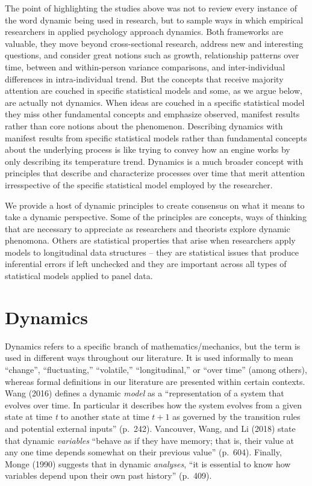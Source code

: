 \documentclass[english,,man]{apa6}
\begin{document}
The point of highlighting the studies above was not to review every instance of the word dynamic being used in research, but to sample ways in which empirical researchers in applied psychology approach dynamics. Both frameworks are valuable, they move beyond cross-sectional research, address new and interesting questions, and consider great notions such as growth, relationship patterns over time, between and within-person variance comparisons, and inter-individual differences in intra-individual trend. But the concepts that receive majority attention are couched in specific statistical models and some, as we argue below, are actually not dynamics. When ideas are couched in a specific statistical model they miss other fundamental concepts and emphasize observed, manifest results rather than core notions about the phenomenon. Describing dynamics with manifest results from specific statistical models rather than fundamental concepts about the underlying process is like trying to convey how an engine works by only describing its temperature trend. Dynamics is a much broader concept with principles that describe and characterize processes over time that merit attention irresspective of the specific statistical model employed by the researcher.

We provide a host of dynamic principles to create consensus on what it means to take a dynamic perspective. Some of the principles are concepts, ways of thinking that are necessary to appreciate as researchers and theorists explore dynamic phenomona. Others are statistical properties that arise when researchers apply models to longitudinal data structures -- they are statistical issues that produce inferential errors if left unchecked and they are important across all types of statistical models applied to panel data.

\hypertarget{dynamics}{%
\section{Dynamics}\label{dynamics}}

Dynamics refers to a specific branch of mathematics/mechanics, but the term is used in different ways throughout our literature. It is used informally to mean \enquote{change}, \enquote{fluctuating,} \enquote{volatile,} \enquote{longitudinal,} or \enquote{over time} (among others), whereas formal definitions in our literature are presented within certain contexts. Wang (2016) defines a dynamic \emph{model} as a \enquote{representation of a system that evolves over time. In particular it describes how the system evolves from a given state at time \emph{t} to another state at time \(t + 1\) as governed by the transition rules and potential external inputs} (p.~242). Vancouver, Wang, and Li (2018) state that dynamic \emph{variables} \enquote{behave as if they have memory; that is, their value at any one time depends somewhat on their previous value} (p.~604). Finally, Monge (1990) suggests that in dynamic \emph{analyses}, \enquote{it is essential to know how variables depend upon their own past history} (p.~409).
\end{document}
